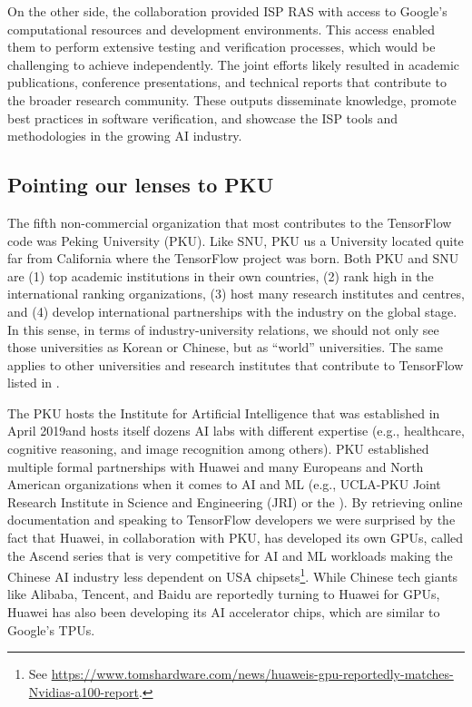\documentclass[CHICAGO,Times1COL]{WileyNJDv5} %
\begin{document}
On the other side, the collaboration provided ISP RAS with access to Google's computational resources and development environments. This access enabled them to perform extensive testing and verification processes, which would be challenging to achieve independently. The joint efforts likely resulted in academic publications, conference presentations, and technical reports that contribute to the broader research community. These outputs disseminate knowledge, promote best practices in software verification, and showcase the ISP tools and methodologies in the growing \ac{AI} industry.

\subsection{Pointing our lenses to PKU}




The fifth non-commercial organization that most contributes to the TensorFlow code was Peking  University (PKU). Like SNU, PKU us a University located quite far from California where the TensorFlow project was born. Both PKU and SNU are (1) top academic institutions in their own countries, (2) rank high in the international ranking organizations, (3) host many research institutes and centres, and (4) develop international partnerships with the industry on the global stage. In this sense, in terms of industry-university relations, we should not only see those universities as Korean or Chinese, but as ``world'' universities. The same applies to other universities and research institutes that contribute to TensorFlow listed in . 


The PKU  hosts the Institute for Artificial Intelligence that was established in April 2019and  hosts itself dozens AI labs  with different expertise (e.g., healthcare, cognitive reasoning, and image recognition among others). PKU established multiple formal partnerships with Huawei and many Europeans and North American organizations when it comes to \ac{AI} and \ac{ML} (e.g., UCLA-PKU Joint Research Institute in Science and Engineering (JRI) or the ). By retrieving online documentation and speaking to TensorFlow developers we were surprised by the fact that 
Huawei, in collaboration with PKU, has developed its own \ac{GPUs}, called the Ascend series that is very competitive for \ac{AI} and \ac{ML} workloads making the Chinese AI industry less dependent on USA chipsets\footnote{ See \href{https://www.tomshardware.com/news/huaweis-gpu-reportedly-matches-Nvidias-a100-report}{https://www.tomshardware.com/news/huaweis-gpu-reportedly-matches-Nvidias-a100-report}.}. While Chinese tech giants like Alibaba, Tencent, and Baidu are reportedly turning to Huawei for \ac{GPUs}, Huawei has also been developing its \ac{AI} accelerator chips, which are similar to Google's \ac{TPUs}.
\end{document}
